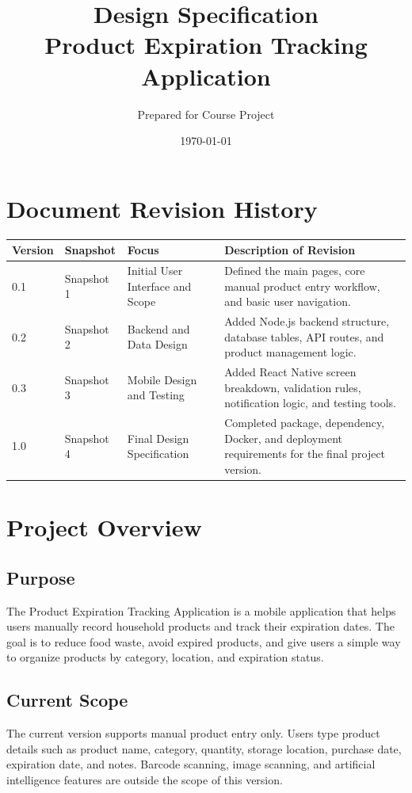 \documentclass[12pt]{article}
\title{Design Specification\\Product Expiration Tracking Application}
\author{Prepared for Course Project}
\date{\today}
\begin{document}
\maketitle
\newpage
\tableofcontents
\newpage

\section*{Document Revision History}

\begin{longtable}{|p{}|p{}|p{}|p{}|}
\hline
\textbf{Version} & \textbf{Snapshot} & \textbf{Focus} & \textbf{Description of Revision} \\
\hline
0.1 & Snapshot 1 & Initial User Interface and Scope & Defined the main pages, core manual product entry workflow, and basic user navigation. \\
\hline
0.2 & Snapshot 2 & Backend and Data Design & Added Node.js backend structure, database tables, API routes, and product management logic. \\
\hline
0.3 & Snapshot 3 & Mobile Design and Testing & Added React Native screen breakdown, validation rules, notification logic, and testing tools. \\
\hline
1.0 & Snapshot 4 & Final Design Specification & Completed package, dependency, Docker, and deployment requirements for the final project version. \\
\hline
\end{longtable}

\section{Project Overview}

\subsection{Purpose}
The Product Expiration Tracking Application is a mobile application that helps users manually record household products and track their expiration dates. The goal is to reduce food waste, avoid expired products, and give users a simple way to organize products by category, location, and expiration status.

\subsection{Current Scope}
The current version supports manual product entry only. Users type product details such as product name, category, quantity, storage location, purchase date, expiration date, and notes. Barcode scanning, image scanning, and artificial intelligence features are outside the scope of this version.
\end{document}
